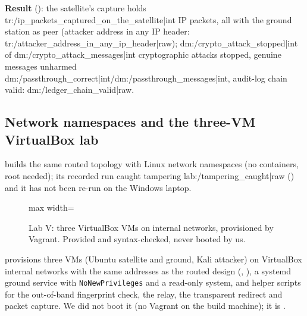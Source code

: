 \textbf{Result} (): the satellite's capture holds {{tr:/ip_packets_captured_on_the_satellite|int}} IP packets, all with the ground station as peer (attacker address in any IP header: {{tr:/attacker_address_in_any_ip_header|raw}}); {{dm:/crypto_attack_stopped|int}} of {{dm:/crypto_attack_messages|int}} cryptographic attacks stopped, genuine messages unharmed {{dm:/passthrough_correct|int}}/{{dm:/passthrough_messages|int}}, audit-log chain valid: {{dm:/ledger_chain_valid|raw}}.

\subsection{Network namespaces and the three-VM VirtualBox lab}
 builds the same routed topology with Linux network namespaces (no containers, root needed); its recorded run caught tampering {{lab:/tampering_caught|raw}} () and it has not been re-run on the Windows laptop.

\begin{figure}[!htbp]
\centering
\begin{adjustbox}{max width=\textwidth}
\end{adjustbox}
\caption{Lab V: three VirtualBox VMs on internal networks, provisioned by Vagrant. Provided and syntax-checked, never booted by us.}
\end{figure}
 provisions three VMs (Ubuntu satellite and ground, Kali attacker) on VirtualBox internal networks with the same addresses as the routed design (, ), a systemd ground service with \texttt{NoNewPrivileges} and a read-only system, and helper scripts for the out-of-band fingerprint check, the relay, the transparent redirect and packet capture. We did not boot it (no Vagrant on the build machine); it is \notmeas.

